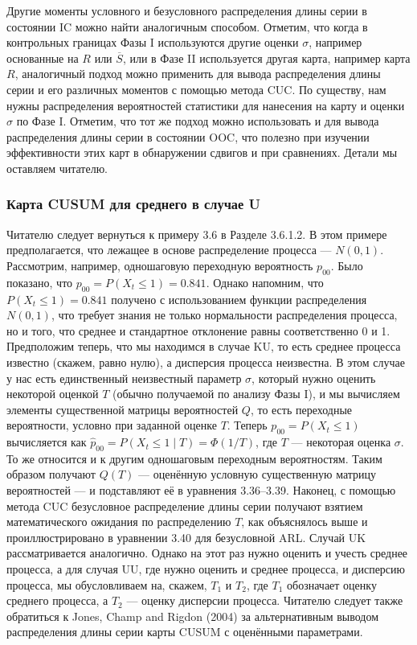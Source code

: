 Другие моменты условного и безусловного распределения длины серии в состоянии IC можно найти аналогичным способом. Отметим, что когда в контрольных границах Фазы I используются другие оценки \(\sigma\), например основанные на \(R\) или \(\overline{S}\), или в Фазе II используется другая карта, например карта \(R\), аналогичный подход можно применить для вывода распределения длины серии и его различных моментов с помощью метода CUC. По существу, нам нужны распределения вероятностей статистики для нанесения на карту и оценки \(\sigma\) по Фазе I. Отметим, что тот же подход можно использовать и для вывода распределения длины серии в состоянии OOC, что полезно при изучении эффективности этих карт в обнаружении сдвигов и при сравнениях. Детали мы оставляем читателю.

\subsubsection{Карта CUSUM для среднего в случае U}

Читателю следует вернуться к примеру 3.6 в Разделе 3.6.1.2. В этом примере предполагается, что лежащее в основе распределение процесса — \(N(0,1)\). Рассмотрим, например, одношаговую переходную вероятность \(p_{00}\). Было показано, что \(p_{00} = P(X_t \le 1) = 0.841\). Однако напомним, что \(P(X_t \le 1) = 0.841\) получено с использованием функции распределения \(N(0,1)\), что требует знания не только нормальности распределения процесса, но и того, что среднее и стандартное отклонение равны соответственно 0 и 1. Предположим теперь, что мы находимся в случае KU, то есть среднее процесса известно (скажем, равно нулю), а дисперсия процесса неизвестна. В этом случае у нас есть единственный неизвестный параметр \(\sigma\), который нужно оценить некоторой оценкой \(T\) (обычно получаемой по анализу Фазы I), и мы вычисляем элементы существенной матрицы вероятностей \(Q\), то есть переходные вероятности, условно при заданной оценке \(T\). Теперь \(p_{00} = P(X_t \le 1)\) вычисляется как \(\hat{p}_{00} = P(X_t \le 1 \mid T) = \Phi(1/T)\), где \(T\) — некоторая оценка \(\sigma\). То же относится и к другим одношаговым переходным вероятностям. Таким образом получают \(Q(T)\) — оценённую условную существенную матрицу вероятностей — и подставляют её в уравнения 3.36–3.39. Наконец, с помощью метода CUC безусловное распределение длины серии получают взятием математического ожидания по распределению \(T\), как объяснялось выше и проиллюстрировано в уравнении 3.40 для безусловной ARL. Случай UK рассматривается аналогично. Однако на этот раз нужно оценить и учесть среднее процесса, а для случая UU, где нужно оценить и среднее процесса, и дисперсию процесса, мы обусловливаем на, скажем, \(T_1\) и \(T_2\), где \(T_1\) обозначает оценку среднего процесса, а \(T_2\) — оценку дисперсии процесса. Читателю следует также обратиться к Jones, Champ and Rigdon (2004) за альтернативным выводом распределения длины серии карты CUSUM с оценёнными параметрами.

